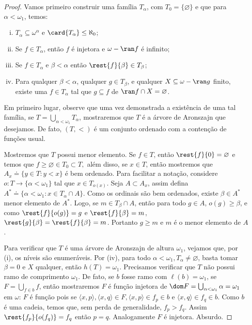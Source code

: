 \documentclass[a4paper]{article}
\theoremstyle{plain}\newtheorem{teo}{Teorema}[section]
\begin{document}
\begin{proof}
  Vamos primeiro construir uma família \(T_\alpha\), com \(T_0=\{\varnothing\}\) e que para \(\alpha
  <\omega_1\), temos:
  \begin{enumerate}[(i)]
    \item \(T_{\alpha} \subseteq \omega^{\alpha}\) e \(\card{T_{\alpha}} \le \aleph_0\);
    \item Se \(f \in T_{\alpha}\), então \(f\) é injetora e \(\omega - \ran f\) é infinito;
    \item Se \(f \in T_{\alpha}\) e \(\beta < \alpha\) então \(\rest{f} {\beta} \in T_{\beta}\);
    \item Para qualquer \(\beta < \alpha\), qualquer \(g \in T_{\beta}\), e
    qualquer \(X \subseteq \omega - \ran g\) finito, existe uma \(f \in
    T_{\alpha}\) tal que \(g \subseteq f\) de \(\ran f \cap X = \varnothing\).
    \end{enumerate}

    Em primeiro lugar, observe que uma vez demonstrada a existência de uma tal família,
    se \(T=\bigcup_{\alpha<\omega_1} T_\alpha\), mostraremos que \(T\) é a árvore de Aronszajn que desejamos. De fato, \((T,<)\) é um conjunto ordenado com a contenção de funções usual.
    
    Mostremos que \(T\) possui menor elemento. Se \(f\in T\), então \(\rest{f}{0}=\varnothing\) e temos que \(f\geq\varnothing\in T_0\subset T,\) além disso, se \(x\in T\), então mostremos que \(A_x\doteq\{y\in T : y<x\}\) é bem ordenado. Para facilitar a notação, considere \(o\colon T\rightarrow \{\alpha<\omega_1\}\) tal que \(x\in T_{o(x)}\). Seja \(A\subset A_x\), assim defina \(A^*\doteq \{\alpha<\omega_1 : x\in T_\alpha\cap A\}\). Como os ordinais são bem ordenados, existe \(\beta\in A^*\) menor elemento de \(A^*\).
    Logo, se \(m\in T_\beta\cap A\), então para todo \(g\in A\), \(o(g)\geq\beta\), e como \(\rest{f}{o(g)}=g\) e \(\rest{f}{\beta}=m\), \(\rest{g}{\beta}=\rest{f}{\beta}=m\). Portanto \(g\geq m\) e \(m\) é o menor elemento de \(A\).
    
    Para verificar que \(T\) é uma árvore de Aronszajn de altura \(\omega_1\), vejamos que, por (i), os níveis são enumeráveis. Por (iv), para todo \(\alpha<\omega_1, T_\alpha\neq\varnothing\), basta tomar \(\beta=0\) e \(X\) qualquer, então \(h(T)=\omega_1\). Precisamos verificar que \(T\) não possui ramo de comprimento \(\omega_1\). De fato, se \(b\) fosse ramo com \(\ell(b)=\omega_1\), se \(F=\bigcup_{f\in b} f\), então mostraremos \(F\) é função injetora de \(\dom F=\bigcup_{\alpha<\omega_1}\alpha=\omega_1\) em \(\omega\): \(F\) é função pois se \(\langle x,p\rangle,\langle x,q\rangle\in F,  \langle x,p\rangle\in f_p\in b\) e \(\langle x,q\rangle\in f_q\in b\). Como \(b\) é uma cadeia, temos que, sem perda de generalidade, \(f_p>f_q\). Assim \(\rest{f_p}{o(f_q)}=f_q\) então \(p=q\). Analogamente \(F\) é injetora. Absurdo.
    

\end{proof}
\end{document}
